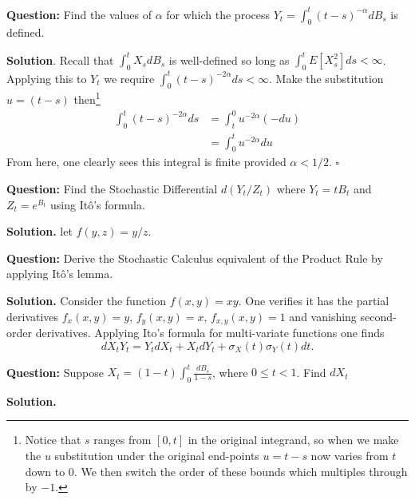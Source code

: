 \documentclass{article}
\begin{document}
\begin{tcolorbox}[colframe=black,colback=gray!5,boxrule=0.5pt]
\textbf{Question:} Find the values of $\alpha$ for which the process $Y_t = \int_0^t(t-s)^{-\alpha}dB_s$ is defined.
\end{tcolorbox}
\textbf{Solution}. Recall that $\int_0^t X_sdB_s$ is well-defined so long as $\int_0^t E[X_s^2]ds<\infty$. Applying this to $Y_t$ we require $\int_0^t(t-s)^{-2\alpha}ds <\infty$. Make the substitution $u = (t-s)$ then\footnote{Notice that $s$ ranges from $[0,t]$ in the original integrand, so when we make the $u$ substitution under the original end-points $u = t-s$ now varies from $t$ down to $0$. We then switch the order of these bounds which multiples through by $-1$.}
\begin{align*}
    \int_0^t(t-s)^{-2\alpha}ds &= \int_t^0 u^{-2\alpha}(-du) \\
    &= \int_0^tu^{-2\alpha}du
\end{align*}
From here, one clearly sees this integral is finite provided $\alpha < 1/2.$ $\square$

\begin{tcolorbox}[colframe=black,colback=gray!5,boxrule=0.5pt]
\textbf{Question:} Find the Stochastic Differential $d(Y_t / Z_t)$ where $Y_t = tB_t$ and $Z_t=e^{B_t}$ using Itô's formula. \cite{Fima}
\end{tcolorbox}
\textbf{Solution.} let $f(y,z) = y/z$. 


\begin{tcolorbox}[colframe=black,colback=gray!5,boxrule=0.5pt]
\textbf{Question:} Derive the Stochastic Calculus equivalent of the Product Rule by applying Itô's lemma. 
\end{tcolorbox}
\textbf{Solution.} Consider the function $f(x,y) = xy$. One verifies it has the partial derivatives $f_x(x,y)=y$, $f_y(x,y)=x$, $f_{x,y}(x,y)=1$ and vanishing second-order derivatives. Applying Ito's formula for multi-variate functions one finds
$$dX_tY_t = Y_tdX_t + X_tdY_t + \sigma_X(t)\sigma_Y(t)dt.$$

\begin{tcolorbox}[colframe=black,colback=gray!5,boxrule=0.5pt]
\textbf{Question:} Suppose $X_t = (1-t)\int_0^t\frac{dB_s}{1-s}$, where $0\leq t<1$. Find $dX_t$
\end{tcolorbox}
\textbf{Solution.} 
\end{document}
